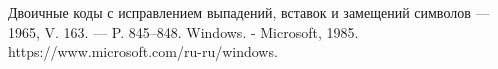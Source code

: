 


\begin{thebibliography}{3}
    Двоичные коды с исправлением выпадений, вставок и замещений символов --- 1965, V. 163. --- P. 845--848.
    Windows. - Microsoft, 1985. https://www.microsoft.com/ru-ru/windows.
    \end{thebibliography}
